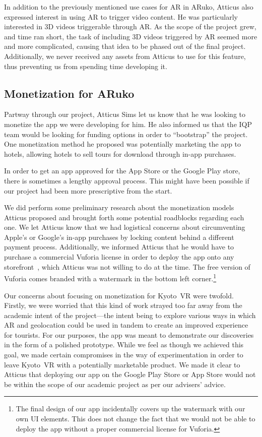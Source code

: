 \documentclass[a4paper, 10pt, american, titlepage]{article}
\begin{document}
In addition to the previously mentioned use cases for AR in ARuko, Atticus also
expressed interest in using AR to trigger video content. He was particularly
interested in 3D videos triggerable through AR. As the scope of the project 
grew, and time ran short, the task of including 3D videos triggered by AR 
seemed more and more complicated, causing that idea to be phased out of the
final project. Additionally, we never received any assets from Atticus to use
for this feature, thus preventing us from spending time developing it. 

\subsection{Monetization for ARuko}
\label{sec:monetizationForAruko}

Partway through our project, Atticus Sims let us know that he was looking to
monetize the app we were developing for him. He also informed us that the IQP
team would be looking for funding options in order to ``bootstrap'' the project.
One monetization method he proposed was potentially marketing the app to hotels,
allowing hotels to sell tours for download through in-app purchases.

In order to get an app approved for the App Store or the Google Play store,
there is sometimes a lengthy approval process. This might have been possible if
our project had been more prescriptive from the start.

We did perform some preliminary research about the monetization models Atticus
proposed and brought forth some potential roadblocks regarding each one. We let
Atticus know that we had logistical concerns about circumventing Apple's or
Google's in-app purchases by locking content behind a different payment process.
Additionally, we informed Atticus that he would have to purchase a commercial
Vuforia license in order to deploy the app onto any
storefront~\autocite{vuforialicense2018}, which Atticus was not willing to do at
the time. The free version of Vuforia comes branded with a watermark in the
bottom left corner.\footnote{The final design of our app incidentally covers up
the watermark with our own UI elements. This does not change the fact that we
would not be able to deploy the app without a proper commercial license for
Vuforia.}

Our concerns about focusing on monetization for Kyoto~VR were twofold. Firstly,
we were worried that this kind of work strayed too far away from the academic
intent of the project---the intent being to explore various ways in which AR and
geolocation could be used in tandem to create an improved experience for
tourists. For our purposes, the app was meant to demonstrate our discoveries in
the form of a polished prototype. While we feel as though we achieved this goal,
we made certain compromises in the way of experimentation in order to leave
Kyoto~VR with a potentially marketable product. We made it clear to Atticus that
deploying our app on the Google Play Store or App Store would not be within the
scope of our academic project as per our advisers' advice.
\end{document}
